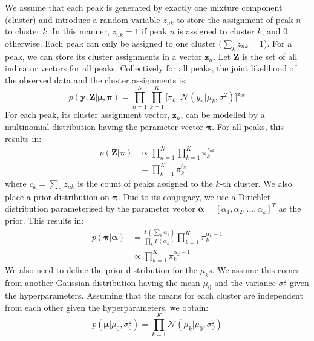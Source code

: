 We assume that each peak is generated by exactly one mixture component (cluster) and introduce a random variable $z_{nk}$ to store the assignment of peak $n$ to cluster $k$. In this manner, $z_{nk}=1$ if peak $n$ is assigned to cluster $k$, and 0 otherwise. Each peak can only be assigned to one cluster ($\sum_{k} z_{nk} = 1$). For a peak, we can store its cluster assignments in a vector $\boldsymbol{z}_{n}$. Let $\boldsymbol{Z}$ is the set of all indicator vectors for all peaks. Collectively for all peaks, the joint likelihood of the observed data and the cluster assignments is:
\begin{equation}
p(\boldsymbol{y},\boldsymbol{Z}  \vert \boldsymbol{\mu},\boldsymbol{\pi}) = \prod_{n=1}^{N} \prod_{k=1}^{K} \big[ \pi_k \enspace \mathcal{N}(y_n \vert \mu_k,\sigma^2) \big]^{\boldsymbol{z}_{nk}}
\label{eq:background-mixture-likelihood}
\end{equation}
For each peak, its cluster assignment vector,  $\boldsymbol{z}_n$, can be modelled by a multinomial distribution having the parameter vector $\boldsymbol{\pi}$. For all peaks, this results in:
\begin{equation}
\begin{aligned}
p(\boldsymbol{Z} \vert \boldsymbol{\pi}) &\propto \prod_{n=1}^N \prod_{k=1}^{K} \pi_k^{z_{nk}} \\
                                                              &= \prod_{k=1}^{K} \pi_k^{c_{k}}
\end{aligned}
\label{eq:background-z-given-pi}
\end{equation}
where $c_{k} = \sum_n z_{nk}$ is the count of peaks assigned to the $k$-th cluster. We also place a prior distribution on $\boldsymbol{\pi}$. Due to its conjugacy, we use a Dirichlet distribution parameterised by the parameter vector $\boldsymbol{\alpha}=[\alpha_1,\alpha_2,...,\alpha_k]^T$ as the prior. This results in:
\begin{equation}
\begin{aligned}
p(\boldsymbol{\pi} \vert \boldsymbol{\alpha}) &= \frac{\Gamma(\sum_{k} \alpha_{k})}{\prod_{k} \Gamma(\alpha_k)}  \prod_{k=1}^{K} \pi_k^{\alpha_{k}-1} \\
                                                                      &\propto \prod_{k=1}^{K} \pi_k^{\alpha_{k}-1}
\end{aligned}
\label{eq:background-pi-given-alpha}
\end{equation}
We also need to define the prior distribution for the $\mu_k$s. We assume this comes from another Gaussian distribution having the mean $\mu_0$ and the variance $\sigma^2_0$ given the hyperparameters. Assuming that the means for each cluster are independent from each other given the hyperparameters, we obtain:
\begin{equation}
p(\boldsymbol{\mu} \vert \mu_0, \sigma^2_0) = \prod_{k=1}^K \mathcal{N}(\mu_k \vert \mu_0, \sigma^2_0)
\label{eq:background-prior-gaussian}
\end{equation}

